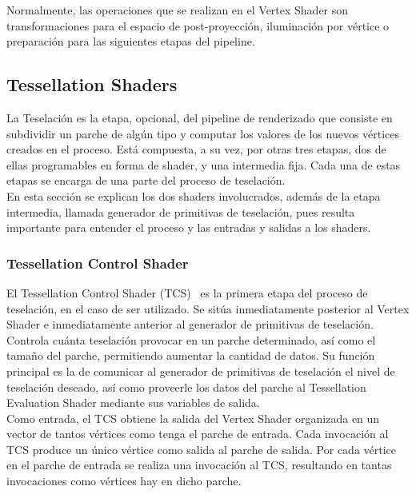 Normalmente, las operaciones que se realizan en el Vertex Shader son
transformaciones para el espacio de post-proyección, iluminación por vértice o
preparación para las siguientes etapas del pipeline. \\

\subsection{Tessellation Shaders}
\label{ref:TesShaders}

La Teselación es la etapa, opcional, del pipeline de renderizado que consiste en
subdividir un parche de algún tipo y computar los valores de los nuevos vértices
creados en el proceso. Está compuesta, a su vez, por otras tres etapas, dos de
ellas programables en forma de shader, y una intermedia fija. Cada una de estas
etapas se encarga de una parte del proceso de teselación.\\ 

En esta sección se explican los dos shaders involucrados, además de la etapa
intermedia, llamada generador de primitivas de teselación, pues resulta
importante para entender el proceso y las entradas y salidas a los shaders.

\subsubsection{Tessellation Control Shader}
\label{ref:TesConShader}

El Tessellation Control Shader (TCS)~\cite{TesConShader} es la primera etapa del
proceso de teselación, en el caso de ser utilizado. Se sitúa inmediatamente
posterior al Vertex Shader e inmediatamente anterior al generador de primitivas
de teselación. Controla cuánta teselación provocar en un parche determinado, así
como el tamaño del parche, permitiendo aumentar la cantidad de datos. Su función
principal es la de comunicar al generador de primitivas de teselación el nivel
de teselación deseado, así como proveerle los datos del parche al Tessellation
Evaluation Shader mediante sus variables de salida. \\

Como entrada, el TCS obtiene la salida del Vertex Shader organizada en un vector
de tantos vértices como tenga el parche de entrada. Cada invocación al TCS
produce un único vértice como salida al parche de salida. Por cada vértice en
el parche de entrada se realiza una invocación al TCS, resultando en tantas
invocaciones como vértices hay en dicho parche. \\

